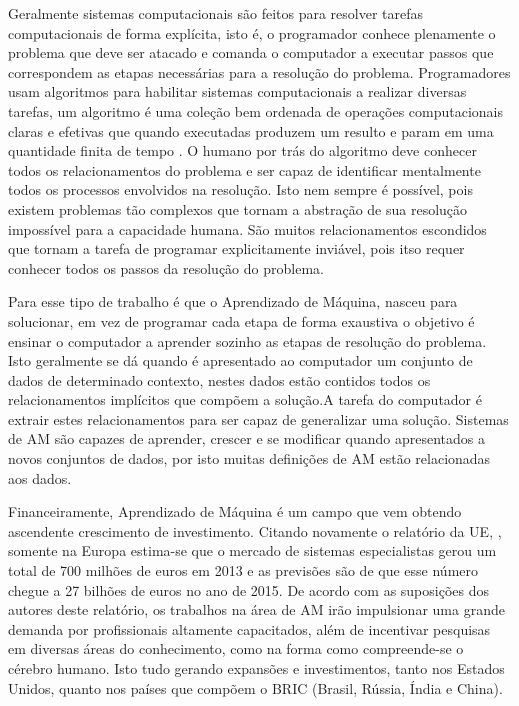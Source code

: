 Geralmente sistemas computacionais são feitos para resolver tarefas computacionais de forma explícita, isto é, o programador conhece plenamente o problema que deve ser atacado e comanda o computador a executar passos que correspondem as etapas necessárias para a resolução do problema. Programadores usam algoritmos para habilitar sistemas computacionais a realizar diversas tarefas, um algoritmo é uma coleção bem ordenada de operações computacionais claras e efetivas que quando executadas produzem um resulto e param em uma quantidade finita de tempo \cite{schn1995}. O humano por trás do algoritmo deve conhecer todos os relacionamentos do problema e ser capaz de identificar mentalmente todos os processos envolvidos na resolução. Isto nem sempre é possível, pois existem problemas tão complexos que tornam a abstração de sua resolução impossível para a capacidade humana. São muitos relacionamentos escondidos que tornam a tarefa de programar explicitamente inviável, pois itso requer conhecer todos os passos da resolução do problema.

Para esse tipo de trabalho é que o Aprendizado de Máquina, nasceu para solucionar, em vez de programar cada etapa de forma exaustiva o objetivo é ensinar o computador a aprender sozinho as etapas de resolução do problema. Isto geralmente se dá quando é apresentado ao computador um conjunto de dados de determinado contexto, nestes dados estão contidos todos os relacionamentos implícitos que compõem a solução.A tarefa do computador é extrair estes relacionamentos para ser capaz de generalizar uma solução. Sistemas de AM são capazes de aprender, crescer e se modificar quando apresentados a novos conjuntos de dados, por isto muitas definições de AM estão relacionadas aos dados.

Financeiramente, Aprendizado de Máquina é um campo que vem obtendo ascendente crescimento de investimento. Citando novamente o relatório da UE, , somente na Europa estima-se que o mercado de sistemas especialistas gerou um total de 700 milhões de euros em 2013 e as previsões são de que esse número chegue a 27 bilhões de euros no ano de 2015. De acordo com as suposições dos autores deste relatório, os trabalhos na área de AM irão impulsionar uma grande demanda por profissionais altamente capacitados, além de incentivar pesquisas em diversas áreas do conhecimento, como na forma como compreende-se o cérebro humano. Isto tudo gerando expansões e investimentos, tanto nos Estados Unidos, quanto nos países que compõem o BRIC (Brasil, Rússia, Índia e China). 

